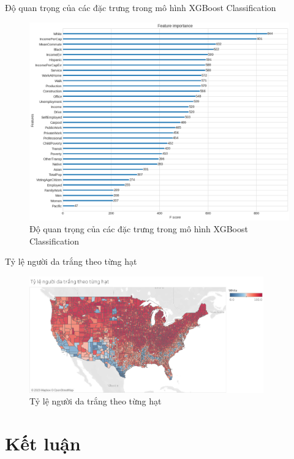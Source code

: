 \documentclass[10pt]{beamer}
\theoremstyle{remark}
\theoremstyle{definition}
\begin{document}
\begin{frame}{Độ quan trọng của các đặc trưng trong mô hình XGBoost Classification}
	\begin{figure}[h!]
        \centering
        \includegraphics[height=0.7\textheight]{figures/XGBoost_Regression_Feature_Importance.png}
        \caption{Độ quan trọng của các đặc trưng trong mô hình XGBoost Classification}
    \end{figure}
\end{frame}

\begin{frame}{Tỷ lệ người da trắng theo từng hạt}
	\begin{figure}[h!]
        \centering
        \includegraphics[width=0.9\textwidth]{figures/County_Percentage_White_People.png}
        \caption{Tỷ lệ người da trắng theo từng hạt}
    \end{figure}
\end{frame}

\section{Kết luận}
\end{document}
